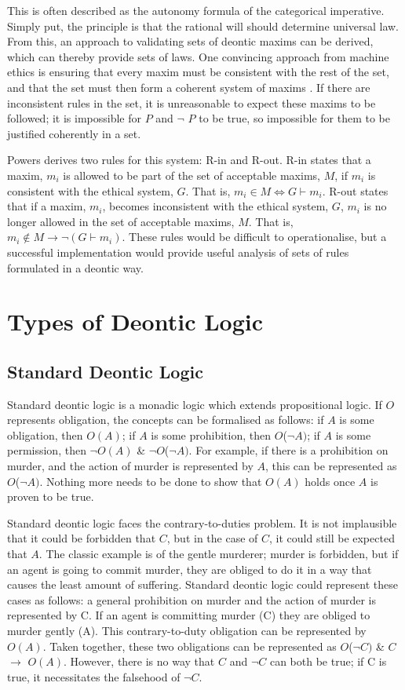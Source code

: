 \documentclass{l4proj}
\begin{document}
This is often described as the autonomy formula of the categorical imperative. Simply put, the principle is that the rational will should determine universal law. From this, an approach to validating sets of deontic maxims can be derived, which can thereby provide sets of laws. One convincing approach from machine ethics is ensuring that every maxim must be consistent with the rest of the set, and that the set must then form a coherent system of maxims \cite{Powers}. If there are inconsistent rules in the set, it is unreasonable to expect these maxims to be followed; it is impossible for $P$ and \( \neg \) $P$ to be true, so impossible for them to be justified coherently in a set. 

Powers derives two rules for this system: R-in and R-out. R-in states that a maxim, $m_i$ is allowed to be part of the set of acceptable maxims, $M$, if $m_i$ is consistent with the ethical system, $G$. That is, $m_i \in M \iff G \vdash m_i $. R-out states that if a maxim, $m_i$, becomes inconsistent with the ethical system, $G$, $m_i$ is no longer allowed in the set of acceptable maxims, $M$. That is, $m_i \notin M \rightarrow \neg(G \vdash m_i)$. These rules would be difficult to operationalise, but a successful implementation would provide useful analysis of sets of rules formulated in a deontic way. 

\section{Types of Deontic Logic}

\subsection{Standard Deontic Logic}
Standard deontic logic is a monadic logic which extends propositional logic. If $O$ represents obligation, the concepts can be formalised as follows: if $A$ is some obligation, then $O(A)$; if $A$ is some prohibition, then $O$(\( \neg \)$A)$; if $A$ is some permission, then \( \neg \)$O(A)$ \& \( \neg \)$O$(\( \neg \)$A)$. For example, if there is a prohibition on murder, and the action of murder is represented by $A$, this can be represented as $O$(\( \neg \)$A)$. Nothing more needs to be done to show that $O(A)$ holds once $A$ is proven to be true. 

Standard deontic logic faces the contrary-to-duties problem. It is not implausible that it could be forbidden that $C$, but in the case of $C$, it could still be expected that $A$. The classic example is of the gentle murderer; murder is forbidden, but if an agent is going to commit murder, they are obliged to do it in a way that causes the least amount of suffering. Standard deontic logic could represent these cases as follows: a general prohibition on murder and the action of murder is represented by C. If an agent is committing murder (C) they are obliged to murder gently (A). This contrary-to-duty obligation can be represented by $O(A)$. Taken together, these two obligations can be represented as $O$(\( \neg \)$C)$ \& $C$ \( \to \) $O(A)$. However, there is no way that $C$ and \( \neg \)$C$ can both be true; if C is true, it necessitates the falsehood of $\neg C$. 
\end{document}
